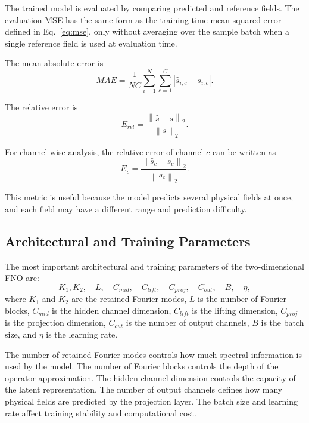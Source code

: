 The trained model is evaluated by comparing predicted and reference fields. The evaluation MSE has the same form as the training-time mean squared error defined in Eq.~\eqref{eq:mse}, only without averaging over the sample batch when a single reference field is used at evaluation time.

The mean absolute error is
\begin{equation}
MAE
=
\frac{1}{NC}
\sum_{i=1}^{N}
\sum_{c=1}^{C}
\left|
\hat{s}_{i,c}
-
s_{i,c}
\right|.
\end{equation}

The relative error is
\begin{equation}
E_{rel}
=
\frac{
\left\|
\hat{s}
-
s
\right\|_2
}{
\left\|
s
\right\|_2
}.
\end{equation}

For channel-wise analysis, the relative error of channel \(c\) can be written as
\begin{equation}
E_c
=
\frac{
\left\|
\hat{s}_{c}
-
s_{c}
\right\|_2
}{
\left\|
s_c
\right\|_2
}.
\end{equation}

This metric is useful because the model predicts several physical fields at once, and each field may have a different range and prediction difficulty.

\subsection{Architectural and Training Parameters}

The most important architectural and training parameters of the two-dimensional FNO are:
\begin{equation}
K_1, K_2,
\quad
L,
\quad
C_{mid},
\quad
C_{lift},
\quad
C_{proj},
\quad
C_{out},
\quad
B,
\quad
\eta,
\end{equation}
where \(K_1\) and \(K_2\) are the retained Fourier modes, \(L\) is the number of Fourier blocks, \(C_{mid}\) is the hidden channel dimension, \(C_{lift}\) is the lifting dimension, \(C_{proj}\) is the projection dimension, \(C_{out}\) is the number of output channels, \(B\) is the batch size, and \(\eta\) is the learning rate.

The number of retained Fourier modes controls how much spectral information is used by the model. The number of Fourier blocks controls the depth of the operator approximation. The hidden channel dimension controls the capacity of the latent representation. The number of output channels defines how many physical fields are predicted by the projection layer. The batch size and learning rate affect training stability and computational cost.

